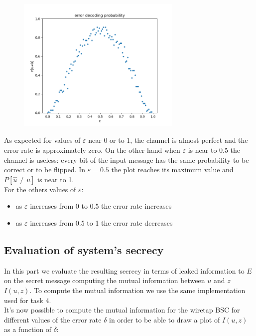\documentclass{report}
\begin{document}
\begin{figure}[H]
\centering
\includegraphics[width=0.7\textwidth]{plot2}
\end{figure}

As expected for values of $\varepsilon$ near 0 or to 1, the channel is almost perfect and the error rate  is approximately zero. On the other hand when $\varepsilon$ is near to 0.5 the channel is useless: every bit of the  input message has the same probability to be correct or to be flipped. In $\varepsilon=0.5$ the plot reaches its maximum value and $P[\hat{u}\neq u]$ is near to 1.\\
For the others values of $\varepsilon$: 
\begin{itemize}
\item as $\varepsilon$ increases from 0 to 0.5 the error rate increases
\item as $\varepsilon$ increases from 0.5 to 1 the error rate decreases
\end{itemize}

\subsection*{Evaluation of system’s secrecy}
In this part we evaluate the resulting secrecy in terms of leaked information to $E$ on the secret  message computing the mutual information between $u$ and $z$ $I(u,z)$. To compute the mutual information we use the same implementation used for task 4.\\
It’s now possible to compute the mutual information for the wiretap BSC for different values of the error rate $\delta$ in order to be able to draw a plot of $I(u,z)$ as a function of $\delta$: 
\end{document}
